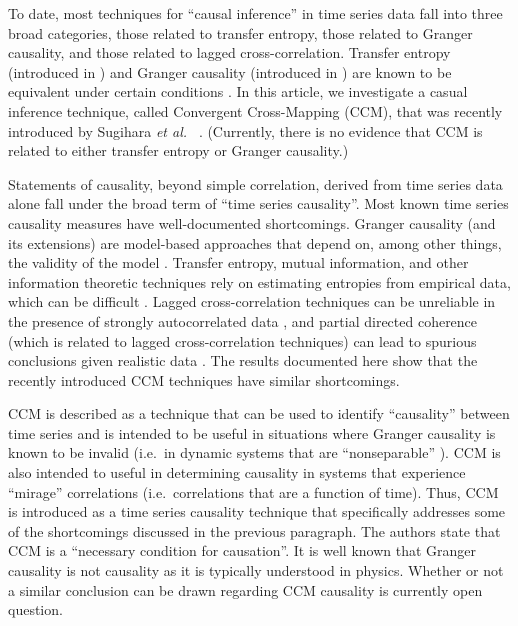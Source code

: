 \documentclass[twocolumn,aps,pre,groupedaddress]{revtex4-1}
\begin{document}
To date, most techniques for ``causal inference'' in time series data fall into three broad categories, those related to transfer entropy, those related to Granger causality, and those related to lagged cross-correlation.  Transfer entropy (introduced in \cite{Schreiber2000}) and Granger causality (introduced in \cite{granger1969}) are known to be equivalent under certain conditions \cite{Barnett2009}.  In this article, we investigate a casual inference technique, called Convergent Cross-Mapping (CCM), that was recently introduced by Sugihara {\em et al.\ } \cite{Sugihara2012}.  (Currently, there is no evidence that CCM is related to either transfer entropy or Granger causality.)

Statements of causality, beyond simple correlation, derived from time series data alone fall under the broad term of ``time series causality''.  Most known time series causality measures have well-documented shortcomings.  Granger causality (and its extensions) are model-based approaches that depend on, among other things, the validity of the model \cite{Kaminski2001,Granger1980}.  Transfer entropy, mutual information, and other information theoretic techniques rely on estimating entropies from empirical data, which can be difficult \cite{Kaiser2002,Schindler2007}.  Lagged cross-correlation techniques can be unreliable in the presence of strongly autocorrelated data \cite{box2013}, and partial directed coherence (which is related to lagged cross-correlation techniques) can lead to spurious conclusions given realistic data \cite{pascual2014}.  The results documented here show that the recently introduced CCM techniques have similar shortcomings.  

CCM is described as a technique that can be used to identify ``causality'' between time series and is intended to be useful in situations where Granger causality is known to be invalid (i.e.\ in dynamic systems that are ``nonseparable'' \cite{Sugihara2012}).  CCM is also intended to useful in determining causality in systems that experience ``mirage'' correlations \cite{Sugihara2012} (i.e.\ correlations that are a function of time).  Thus, CCM is introduced as a time series causality technique that specifically addresses some of the shortcomings discussed in the previous paragraph.  The authors state that CCM is a ``necessary condition for causation''.  It is well known \cite{Granger1980,liu2012,Roberts1985} that Granger causality is not causality as it is typically understood in physics.  Whether or not a similar conclusion can be drawn regarding CCM causality is currently open question. 
\end{document}
